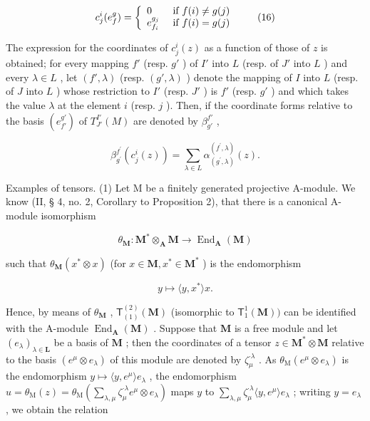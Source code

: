 \[
c _ {j} ^ {i} (e _ {f} ^ {g}) = \left\{ \begin{array}{l l} 0 & \text { if } f (i) \neq g (j) \\ e _ {f _ {i}} ^ {g _ {j}} & \text { if } f (i) = g (j) \end{array} \right.\tag{16}
\]

The expression for the coordinates of \(c_j^i(z)\) as a function of those of \(z\) is obtained; for every mapping \(f'\) (resp. \(g'\) ) of \(I'\) into \(L\) (resp. of \(J'\) into \(L\) ) and every \(\lambda \in L\) , let \((f', \lambda)\) (resp. \((g', \lambda)\) ) denote the mapping of \(I\) into \(L\) (resp. of \(J\) into \(L\) ) whose restriction to \(I'\) (resp. \(J'\) ) is \(f'\) (resp. \(g'\) ) and which takes the value \(\lambda\) at the element \(i\) (resp. \(j\) ). Then, if the coordinate forms relative to the basis \((e_{f'}^{g'})\) of \(T_{J'}^{I'}(M)\) are denoted by \(\beta_{g'}^{f'}\) ,

\[
\beta_ {g ^ {\prime}} ^ {f ^ {\prime}} (c _ {j} ^ {i} (z)) = \sum_ {\lambda \in L} \alpha_ {(g ^ {\prime}, \lambda)} ^ {(f ^ {\prime}, \lambda)} (z).\tag{17}
\]

Examples of tensors. (1) Let M be a finitely generated projective A-module. We know (II, § 4, no. 2, Corollary to Proposition 2), that there is a canonical A-module isomorphism

\[
\theta_ {\mathbf {M}} \colon \mathbf {M} ^ {*} \otimes_ {\mathbf {A}} \mathbf {M} \rightarrow \operatorname{End} _ {\mathbf {A}} (\mathbf {M})
\]

such that \(\theta_{\mathbf{M}}(x^{*}\otimes x)\) (for \(x\in \mathbf{M},x^{*}\in \mathbf{M}^{*}\) ) is the endomorphism

\[
y \mapsto \langle y, x ^ {*} \rangle x.
\]

Hence, by means of \(\theta_{\mathbf{M}}\) , \(\mathsf{T}_{(1)}^{(2)}(\mathbf{M})\) (isomorphic to \(\mathsf{T}_1^1 (\mathbf{M}))\) can be identified with the A-module \(\operatorname{End}_{\mathbf{A}}(\mathbf{M})\) . Suppose that \(\mathbf{M}\) is a free module and let \((e_{\lambda})_{\lambda \in \mathbf{L}}\) be a basis of \(\mathbf{M}\) ; then the coordinates of a tensor \(z\in \mathbf{M}^*\otimes \mathbf{M}\) relative to the basis \((e^{\mu}\otimes e_{\lambda})\) of this module are denoted by \(\zeta_{\mu}^{\cdot \lambda}\) . As \(\theta_{\mathrm{M}}(e^{\mu}\otimes e_{\lambda})\) is the endomorphism \(y\mapsto \langle y,e^{\mu}\rangle e_{\lambda}\) , the endomorphism \(u = \theta_{\mathrm{M}}(z) = \theta_{\mathrm{M}}\left(\sum_{\lambda ,\mu}\zeta_{\mu}^{\cdot \lambda}e^{\mu}\otimes e_{\lambda}\right)\) maps \(y\) to \(\sum_{\lambda ,\mu}\zeta_{\mu}^{\cdot \lambda}\langle y,e^{\mu}\rangle e_{\lambda}\) ; writing \(y = e_{\lambda}\) , we obtain the relation

